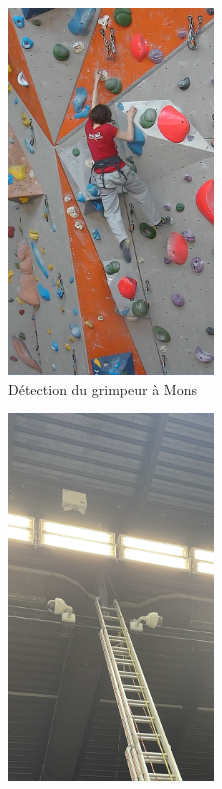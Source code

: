 \documentclass[a4paper, 11pt, french]{article}
\begin{document}
\begin{figure}[!ht]
\begin{center}
        \begin{subfigure}[b]{0.45\textwidth}
            \centering
            \includegraphics[width=0.6\textwidth]{VinesioGrimpe.png}
            \caption{Détection du grimpeur à Mons}
            \label{fig:test3}
        \end{subfigure}
        \begin{subfigure}[b]{0.45\textwidth}
            \centering
            \includegraphics[width=0.6\textwidth]{instalCamera.JPEG}

\end{subfigure}
\end{center}
\end{figure}
\end{document}
